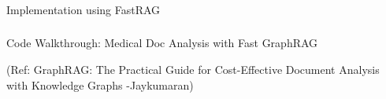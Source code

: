 \begin{frame}[fragile]\frametitle{}
\begin{center}
{\Large Implementation using FastRAG}
\end{center}
\end{frame}



	
	



	
	

\begin{frame}[fragile]\frametitle{}
\begin{center}
{\Large Code Walkthrough: Medical Doc Analysis with Fast GraphRAG}

	{\tiny (Ref: GraphRAG: The Practical Guide for Cost-Effective Document Analysis with Knowledge Graphs -Jaykumaran)}
	
\end{center}
\end{frame}


